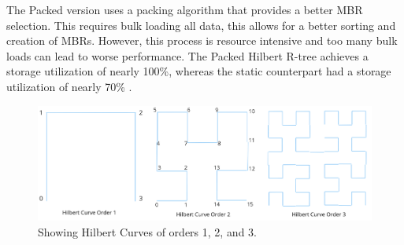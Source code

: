 The Packed version uses a packing algorithm that provides a better MBR selection. This requires bulk loading all data, this allows for a better sorting and creation of MBRs. However, this process is resource intensive and too many bulk loads can lead to worse performance. The Packed Hilbert R-tree achieves a storage utilization of nearly 100\%, whereas the static counterpart had a storage utilization of nearly 70\% \cite{rtree}.

\begin{figure}[t]
    \centering
    \includegraphics[width=\linewidth]{./figures/hilbert_orders.png}
    \caption{Showing Hilbert Curves of orders 1, 2, and 3.}
    \label{fig:hilbert}
\end{figure}

